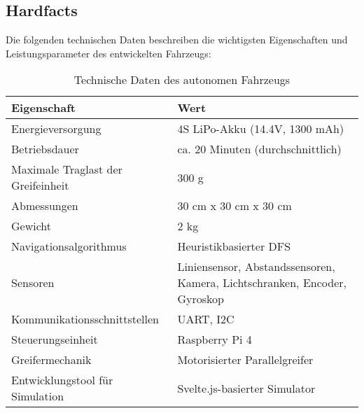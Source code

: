 \documentclass[main.tex]{subfiles} %
\begin{document}

\subsection{Hardfacts}

Die folgenden technischen Daten beschreiben die wichtigsten Eigenschaften und
Leistungsparameter des entwickelten Fahrzeugs:

\begin{table}[H]
    \centering
    \renewcommand{\arraystretch}{1.5}
    \begin{tabular}{|l|p{7cm}|}
        \hline
        \textbf{Eigenschaft}               & \textbf{Wert}                                                             \\ \hline
        Energieversorgung                  & 4S LiPo-Akku (14.4V, 1300 mAh)                                            \\ \hline
        Betriebsdauer                      & ca. 20 Minuten (durchschnittlich)                                         \\ \hline
        Maximale Traglast der Greifeinheit & 300 g                                                                     \\ \hline %
        Abmessungen                        & 30 cm x 30 cm x 30 cm                                                     \\ \hline
        Gewicht                            & 2 kg                                                                      \\ \hline
        Navigationsalgorithmus             & Heuristikbasierter DFS                                                    \\ \hline
        Sensoren                           & Liniensensor, Abstandssensoren, Kamera, Lichtschranken, Encoder, Gyroskop \\ \hline
        Kommunikationsschnittstellen       & UART, I2C                                                                 \\ \hline
        Steuerungseinheit                  & Raspberry Pi 4                                                            \\ \hline %
        Greifermechanik                    & Motorisierter Parallelgreifer                                             \\ \hline
        Entwicklungstool für Simulation    & Svelte.js-basierter Simulator                                             \\ \hline
    \end{tabular}
    \caption{Technische Daten des autonomen Fahrzeugs}
    \label{tab:hardfacts}
\end{table}
\end{document}
